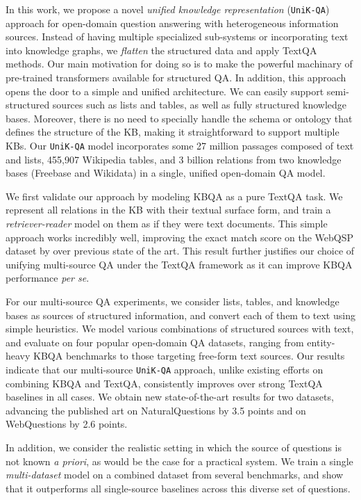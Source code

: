 \documentclass[11pt]{article}
\newcommand{\uniqa}{\texttt{UniK-QA}\xspace}
\begin{document}
In this work, we propose a novel \emph{unified knowledge representation} (\uniqa{}) approach for open-domain question answering with heterogeneous information sources.
Instead of having multiple specialized sub-systems or incorporating text into knowledge graphs, we \textit{flatten} the structured data and apply TextQA methods.  Our main motivation for doing so is to make the powerful machinary of pre-trained transformers available for structured QA. 
In addition, this approach opens the door to a simple and unified architecture.  We can easily support semi-structured sources such as lists and tables, as well as fully structured knowledge bases.
Moreover, there is no need to specially handle the schema or ontology that defines the structure of the KB, making it straightforward to support multiple KBs.
Our \uniqa{} model incorporates some 27 million passages composed of text and lists, 455,907 Wikipedia tables, and 3 billion relations from two knowledge bases (Freebase and Wikidata) in a single, unified open-domain QA model.

We first validate our approach by modeling KBQA as a pure TextQA task.  We represent all relations in the KB with their textual surface form, and train a \emph{retriever-reader} model on them as if they were text documents.  This simple approach works incredibly well, improving the exact match score on the WebQSP dataset by  over previous state of the art. 
This result further justifies our choice of unifying multi-source QA under the TextQA framework as it can improve KBQA performance \emph{per se}.

For our multi-source QA experiments, we consider lists, tables, and knowledge bases as sources of structured information, and convert each of them to text using simple heuristics.  We model various combinations of structured sources with text, and evaluate on four popular open-domain QA datasets, ranging from entity-heavy KBQA benchmarks to those targeting free-form text sources.
Our results indicate that our multi-source \uniqa{} approach, unlike existing efforts on combining KBQA and TextQA, consistently improves over strong TextQA baselines in all cases.
We obtain new state-of-the-art results for two datasets, advancing the published art on NaturalQuestions by 3.5 points and on WebQuestions by 2.6 points.

In addition, we consider the realistic setting in which the source of questions is not known \emph{a priori}, as would be the case for a practical system. 
We train a single \emph{multi-dataset} model on a combined dataset from several benchmarks, and show that it outperforms all single-source baselines across this diverse set of questions.
\end{document}
